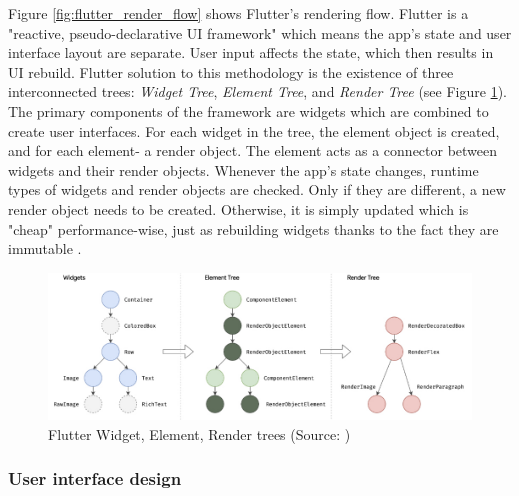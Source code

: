 Figure \ref{fig:flutter_render_flow} shows Flutter's rendering flow. Flutter is a "reactive, pseudo-declarative UI framework" which means the app's state and user interface layout are separate. User input affects the state, which then results in UI rebuild. Flutter solution to this methodology is the existence of three interconnected trees: \emph{Widget Tree}, \emph{Element Tree}, and \emph{Render Tree} (see Figure \ref{fig:flutter_trees}). The primary components of the framework are widgets which are combined to create user interfaces. For each widget in the tree, the element object is created, and for each element- a render object. The element acts as a connector between widgets and their render objects. Whenever the app's state changes, runtime types of widgets and render objects are checked. Only if they are different, a new render object needs to be created. Otherwise, it is simply updated which is "cheap" performance-wise, just as rebuilding widgets thanks to the fact they are immutable \cite{flutter_docs_architecture}.

\begin{figure}[h]
    \centering
    \includegraphics[width=\textwidth]{img/flutter_trees}
    \caption{Flutter Widget, Element, Render trees (Source: \cite{flutter_docs_architecture})}
    \label{fig:flutter_trees}
\end{figure}

\subsubsection*{User interface design}

